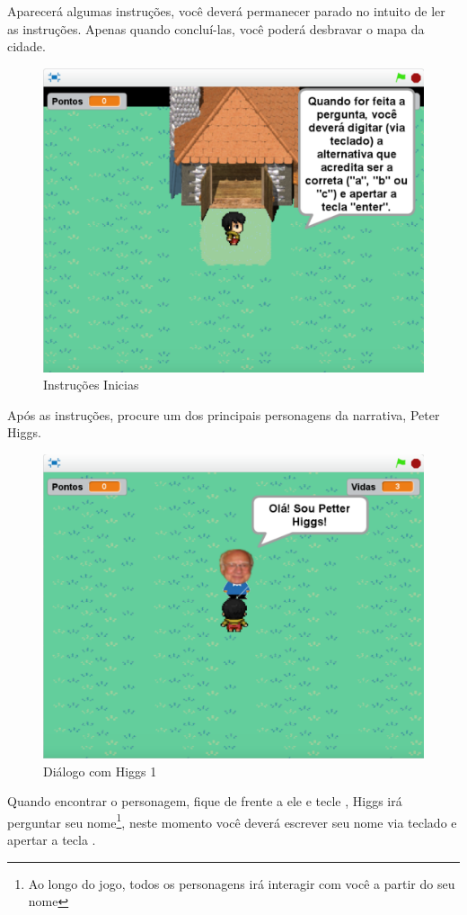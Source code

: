 \documentclass[12pt,fleqn]{book} %
\begin{document}
Aparecerá algumas instruções, você deverá permanecer parado no intuito de ler as instruções. Apenas quando concluí-las, você poderá desbravar o mapa da cidade. 

\begin{figure}[h]
	\centering
	\includegraphics[width=0.65 \textwidth]{Produto/jogo_2}
	\caption{Instruções Inicias}
	\label{fig:app_a:jogo2}
\end{figure}

\newpage

Após as instruções, procure um dos principais personagens da narrativa, Peter Higgs.

\begin{figure}[h]
	\centering
	\includegraphics[width=0.65 \textwidth]{Produto/jogo_3}
	\caption{Diálogo com Higgs 1}
	\label{fig:app_a:jogo3}
\end{figure}

Quando encontrar o personagem, fique de frente a ele e tecle , Higgs irá perguntar seu nome\footnote{Ao longo do jogo, todos os personagens irá interagir com você a partir do seu nome}, neste momento você deverá escrever seu nome via teclado e apertar a tecla .
\end{document}
